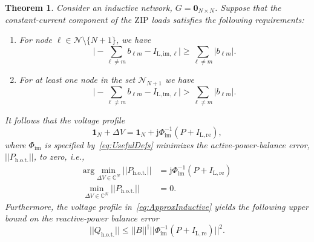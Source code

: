 \documentclass[10 pt, conference]{ieeeconf}
\newtheorem{theorem}{Theorem}
\begin{document}
\begin{theorem}
\label{prop:inductive_main}
Consider an inductive network, $G = \mathbf{0}_{N \times N}$. Suppose that the constant-current component of the $\mathrm{ZIP}$ loads satisfies the following requirements:
\begin{enumerate}
\item For node $\ell \in \mathcal{N}\setminus\{ N + 1\}$, we have
\begin{equation} \label{eq:ILcondition1}
\Big|-\sum_{\ell \neq m} b_{\ell m} - I_{\mathrm{L,im},\ell} \Big| \geq \sum_{\ell \neq m} |b_{\ell m}|. 
\end{equation}
\item For at least one node in the set $\mathcal{N}_{N+1}$ we have 
\begin{equation} \label{eq:ILcondition2}
\Big|-\sum_{\ell \neq m} b_{\ell m} - I_{\mathrm{L,im},\ell} \Big| > \sum_{\ell \neq m} |b_{\ell m}|. 
\end{equation}
\end{enumerate}
It follows that the voltage profile
\begin{equation} \label{eq:ApproxInductive}
\mathbf{1}_N + \Delta V = \mathbf{1}_N + \mathrm j  \Phi_\mathrm{im}^{-1} (P + I_\mathrm{L,re}),
\end{equation}
where $\Phi_\mathrm{im}$ is specified by~\eqref{eq:UsefulDefs} minimizes the active-power-balance error, $||P_\mathrm{h.o.t.}||$, to zero, i.e., 
\begin{align} \label{eq:InductiveResult1}
\mathrm{arg} \min_{\Delta V \in \mathbb{C}^N} ||P_\mathrm{h.o.t.}|| &= \mathrm j \Phi_\mathrm{im}^{-1} (P + I_\mathrm{L,re}) \nonumber \\
\min_{\Delta V \in \mathbb{C}^N} ||P_\mathrm{h.o.t.}|| &= 0.
\end{align}
Furthermore, the voltage profile in~\eqref{eq:ApproxInductive} yields the following upper bound on the reactive-power balance error
\begin{equation} \label{eq:QhotBound}
||Q_\mathrm{h.o.t.}|| \leq ||B||^\dagger ||\Phi_\mathrm{im}^{-1} (P + I_\mathrm{L,re})||^2.
\end{equation}\end{theorem}
\end{document}
